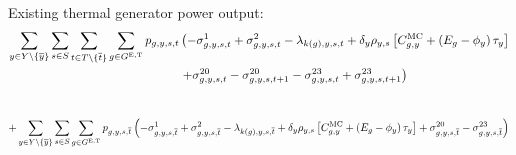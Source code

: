 \documentclass{article}
\begin{document}

Existing thermal generator power output:
\begin{align}
	\sum\limits_{\iYear \in \sYears 
		\setminus \{\iYearTerminal\}
	}\sum\limits_{\iScenario \in \sScenarios}\sum\limits_{\iInterval \in \sIntervals \setminus \{\iIntervalTerminal\}} \sum\limits_{\iGenerator \in \sGeneratorsExistingThermal} \vPower &\left( -\dMinPowerOutput + \dMaxPowerOutputExistingThermal 
	- \dPowerBalance[k(\iGenerator),\iYear,\iScenario,\iInterval] + \cDiscountRate \cScenarioDuration \left[\cMarginalCost + \left(\cEmissionsIntensity - \vBaseline\right)\vPermitPrice \right] \right. \nonumber\\
	& \left. + \dRampRateUp - \dRampRateUp[\iGenerator,\iYear,\iScenario,\iInterval + 1] - \dRampRateDown + \dRampRateDown[\iGenerator,\iYear,\iScenario,\iInterval + 1]
	\right)\\\nonumber
\end{align}

\begin{equation}
	+ \sum\limits_{\iYear \in \sYears 
		\setminus \{\iYearTerminal\}
	}\sum\limits_{\iScenario \in \sScenarios} \sum\limits_{\iGenerator \in \sGeneratorsExistingThermal} \vPower[\iGenerator,\iYear,\iScenario,\iIntervalTerminal] \left(-\dMinPowerOutput[\iGenerator,\iYear,\iScenario,\iIntervalTerminal] + \dMaxPowerOutputExistingThermal[\iGenerator,\iYear,\iScenario,\iIntervalTerminal] 
	- \dPowerBalance[k(\iGenerator),\iYear,\iScenario,\iIntervalTerminal] + \cDiscountRate \cScenarioDuration \left[\cMarginalCost + \left(\cEmissionsIntensity - \vBaseline\right)\vPermitPrice \right] + \dRampRateUp[\iGenerator,\iYear,\iScenario,\iIntervalTerminal] - \dRampRateDown[\iGenerator,\iYear,\iScenario,\iIntervalTerminal] \right)\\
\end{equation}
\end{document}
